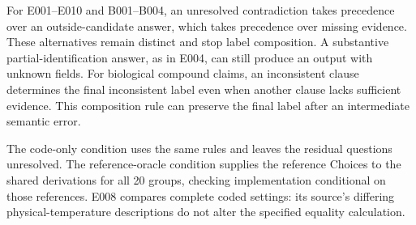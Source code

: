 For E001--E010 and B001--B004, an unresolved contradiction takes precedence over an outside-candidate answer, which takes precedence over missing evidence. These alternatives remain distinct and stop label composition. A substantive partial-identification answer, as in E004, can still produce an output with unknown fields. For biological compound claims, an inconsistent clause determines the final inconsistent label even when another clause lacks sufficient evidence. This composition rule can preserve the final label after an intermediate semantic error.

The code-only condition uses the same rules and leaves the residual questions unresolved. The reference-oracle condition supplies the reference Choices to the shared derivations for all 20 groups, checking implementation conditional on those references. E008 compares complete coded settings: its source's differing physical-temperature descriptions do not alter the specified equality calculation.
